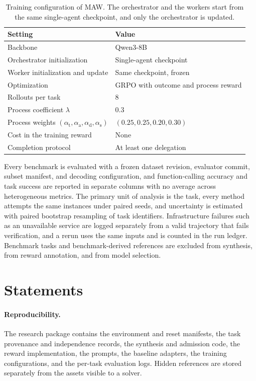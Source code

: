 \begin{table}[ht]
\centering\small
\caption{Training configuration of MAW. The orchestrator and the workers start from the same single-agent checkpoint, and only the orchestrator is updated.}
\label{tab:config}
\begin{tabularx}{\linewidth}{YY}
\toprule
Setting & Value \\
\midrule
Backbone & Qwen3-8B \\
Orchestrator initialization & Single-agent checkpoint \\
Worker initialization and update & Same checkpoint, frozen \\
Optimization & GRPO with outcome and process reward \\
Rollouts per task & 8 \\
Process coefficient $\lambda$ & 0.3 \\
Process weights $(\alpha_{\mathrm t},\alpha_{\mathrm a},\alpha_{\mathrm d},\alpha_{\mathrm s})$ & $(0.25,0.25,0.20,0.30)$ \\
Cost in the training reward & None \\
Completion protocol & At least one delegation \\
\bottomrule
\end{tabularx}
\end{table}

Every benchmark is evaluated with a frozen dataset revision, evaluator commit, subset manifest, and decoding configuration, and function-calling accuracy and task success are reported in separate columns with no average across heterogeneous metrics.
The primary unit of analysis is the task, every method attempts the same instances under paired seeds, and uncertainty is estimated with paired bootstrap resampling of task identifiers.
Infrastructure failures such as an unavailable service are logged separately from a valid trajectory that fails verification, and a rerun uses the same inputs and is counted in the run ledger.
Benchmark tasks and benchmark-derived references are excluded from synthesis, from reward annotation, and from model selection.

\section{Statements}
\label{app:statements}

\paragraph{Reproducibility.}
The research package contains the environment and reset manifests, the task provenance and independence records, the synthesis and admission code, the reward implementation, the prompts, the baseline adapters, the training configurations, and the per-task evaluation logs.
Hidden references are stored separately from the assets visible to a solver.

